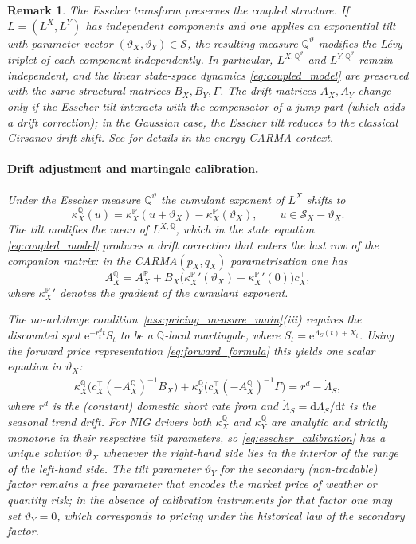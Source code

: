 \documentclass[10pt,a4paper,reqno]{amsart}
\newtheorem{remark}[theorem]{Remark}
\newcommand{\Q}{\mathbb{Q}}
\newcommand{\PP}{\mathbb{P}}
\newcommand{\1}{\mathbbm{1}}
\newcommand{\dd}{\mathrm{d}}
\newcommand{\ee}{\mathrm{e}}
\begin{document}
\begin{remark}\label{rem:esscher_preservation}
The Esscher transform preserves the coupled structure. If $L = (L^X, L^Y)$
has independent components and one applies an exponential tilt with parameter
vector $(\vartheta_X, \vartheta_Y) \in \mathcal{S}$, the resulting measure
$\Q^{\vartheta}$ modifies the Lévy triplet of each component independently.
In particular, $L^{X,\Q^\vartheta}$ and $L^{Y,\Q^\vartheta}$ remain
independent, and the linear state-space dynamics \eqref{eq:coupled_model} are
preserved with the same structural matrices $B_X, B_Y, \Gamma$. The drift
matrices $A_X, A_Y$ change only if the Esscher tilt interacts with the
compensator of a jump part (which adds a drift correction); in the Gaussian
case, the Esscher tilt reduces to the classical Girsanov drift shift. See
\citet{Ben14} for details in the energy CARMA context.

\paragraph{Drift adjustment and martingale calibration.}
Under the Esscher measure $\Q^\vartheta$ the cumulant exponent of $L^X$
shifts to
$$
  \kappa_X^{\Q}(u)
  = \kappa_X^{\PP}(u + \vartheta_X) - \kappa_X^{\PP}(\vartheta_X),
  \qquad u \in \mathcal{S}_X - \vartheta_X.
$$
The tilt modifies the mean of $L^{X,\Q}$, which in the state equation
\eqref{eq:coupled_model} produces a drift correction that enters the last
row of the companion matrix: in the CARMA$(p_X,q_X)$ parametrisation one
has
$$
  A_X^{\Q}
  = A_X^{\PP}
    + B_X
      \bigl(\kappa_X^{\PP}{}'\!(\vartheta_X)
            - \kappa_X^{\PP}{}'\!(0)\bigr)
      c_X^\top,
$$
where $\kappa_X^{\PP}{}'$ denotes the gradient of the cumulant exponent.

The no-arbitrage condition~\ref{ass:pricing_measure_main}(iii)
requires the discounted spot $\ee^{-r_t^d t}S_t$ to be a $\Q$-local martingale,
where $S_t = \ee^{\Lambda_S(t)+X_t}$.  Using the forward price representation
\eqref{eq:forward_formula} this yields one scalar equation in $\vartheta_X$:
\begin{align}\label{eq:esscher_calibration}
  \kappa_X^{\Q}\!\bigl(c_X^\top(-A_X^{\Q})^{-1}B_X\bigr)
  + \kappa_Y^{\Q}\!\bigl(c_X^\top(-A_X^{\Q})^{-1}\Gamma\bigr)
  = r^d - \dot\Lambda_S,
\end{align}
where $r^d$ is the (constant) domestic short rate from
 and $\dot\Lambda_S = \dd\Lambda_S/\dd t$ is the
seasonal trend drift.
For NIG drivers both $\kappa_X^{\Q}$ and $\kappa_Y^{\Q}$ are analytic and
strictly monotone in their respective tilt parameters, so
\eqref{eq:esscher_calibration} has a unique solution $\vartheta_X$ whenever
the right-hand side lies in the interior of the range of the left-hand side.
The tilt parameter $\vartheta_Y$ for the secondary (non-tradable) factor
remains a free parameter that encodes the market price of weather or quantity
risk; in the absence of calibration instruments for that factor one may set
$\vartheta_Y = 0$, which corresponds to pricing under the historical law of
the secondary factor.
\end{remark}
\end{document}
